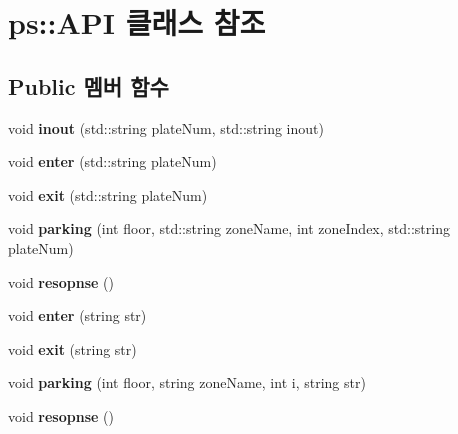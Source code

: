 \hypertarget{classps_1_1_a_p_i}{}\section{ps\+:\+:A\+PI 클래스 참조}
\label{classps_1_1_a_p_i}
\subsection*{Public 멤버 함수}
\begin{DoxyCompactItemize}
\item 
\mbox{\label{classps_1_1_a_p_i_ac282e6bc90a0bd72202ffa74d42c4b44}} 
void {\bfseries inout} (std\+::string plate\+Num, std\+::string inout)
\item 
\mbox{\label{classps_1_1_a_p_i_a0df871e4af9852db007615b6d2b35d09}} 
void {\bfseries enter} (std\+::string plate\+Num)
\item 
\mbox{\label{classps_1_1_a_p_i_a04f45e81f0cbc0b5daa6489b7f840334}} 
void {\bfseries exit} (std\+::string plate\+Num)
\item 
\mbox{\label{classps_1_1_a_p_i_a9cea485156c6468e70c5c6442c3cd65e}} 
void {\bfseries parking} (int floor, std\+::string zone\+Name, int zone\+Index, std\+::string plate\+Num)
\item 
\mbox{\label{classps_1_1_a_p_i_a248e7f4b193ec8c5eb5adfa408e50779}} 
void {\bfseries resopnse} ()
\item 
\mbox{\label{classps_1_1_a_p_i_a95079fba53baabfafc37e52a6019ba02}} 
void {\bfseries enter} (string str)
\item 
\mbox{\label{classps_1_1_a_p_i_a3d5c8c0fbc56d5dc664e5c0e6747f4f4}} 
void {\bfseries exit} (string str)
\item 
\mbox{\label{classps_1_1_a_p_i_a7d7ef9bf708cb009945fcf3b7064977f}} 
void {\bfseries parking} (int floor, string zone\+Name, int i, string str)
\item 
\mbox{\label{classps_1_1_a_p_i_a248e7f4b193ec8c5eb5adfa408e50779}} 
void {\bfseries resopnse} ()
\end{DoxyCompactItemize}
